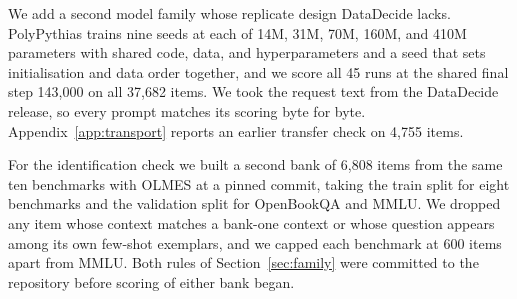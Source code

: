 We add a second model family whose replicate design DataDecide lacks. PolyPythias \citep{vanderwal2025} trains nine seeds at each of 14M, 31M, 70M, 160M, and 410M parameters with shared code, data, and hyperparameters and a seed that sets initialisation and data order together, and we score all 45 runs at the shared final step 143,000 on all 37,682 items. We took the request text from the DataDecide release, so every prompt matches its scoring byte for byte. Appendix~\ref{app:transport} reports an earlier transfer check on 4,755 items.

For the identification check we built a second bank of 6,808 items from the same ten benchmarks with OLMES at a pinned commit, taking the train split for eight benchmarks and the validation split for OpenBookQA and MMLU. We dropped any item whose context matches a bank-one context or whose question appears among its own few-shot exemplars, and we capped each benchmark at 600 items apart from MMLU. Both rules of Section~\ref{sec:family} were committed to the repository before scoring of either bank began.

